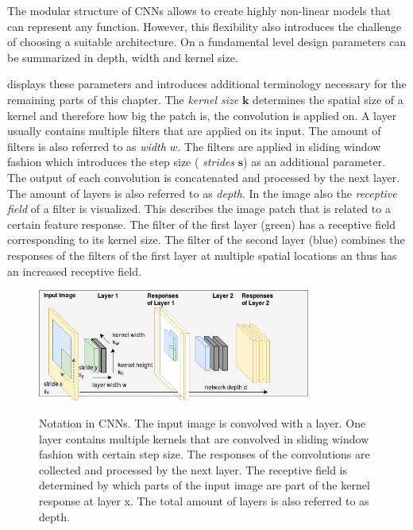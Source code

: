 The modular structure of \acp{CNN} allows to create highly non-linear models that can represent any function. However, this flexibility also introduces the challenge of choosing a suitable architecture. On a fundamental level design parameters can be summarized in depth, width and kernel size. 

 displays these parameters and introduces additional terminology necessary for the remaining parts of this chapter. The \textit{kernel size} $\textbf{k}$ determines the spatial size of a kernel and therefore how big the patch is, the convolution is applied on. A layer usually contains multiple filters that are applied on its input. The amount of filters is also referred to as \textit{width} $w$. The filters are applied in sliding window fashion which introduces the step size ( \textit{strides} $\mathbf{s}$) as an additional parameter. The output of each convolution is concatenated and processed by the next layer. The amount of layers is also referred to as \textit{depth}. In the image also the \textit{receptive field} of a filter is visualized. This describes the image patch that is related to a certain feature response. The filter of the first layer (green) has a receptive field corresponding to its kernel size. The filter of the second layer (blue) combines the responses of the filters of the first layer at multiple spatial locations an thus has an increased receptive field.

\begin{figure}[hbtp]
	\centering
	\includegraphics[width=0.8\textwidth]{fig/model_design}
	\label{fig:model_design}
	\caption{Notation in \acp{CNN}. The input image is convolved with a layer. One layer contains multiple kernels that are convolved in sliding window fashion with certain step size. The responses of the convolutions are collected and processed by the next layer. The receptive field is determined by which parts of the input image are part of the kernel response at layer x. The total amount of layers is also referred to as depth.}
\end{figure}

